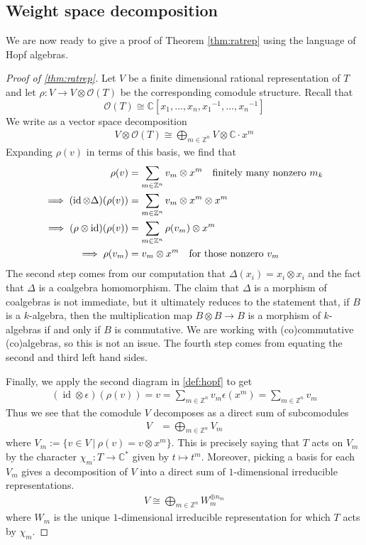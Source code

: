 \documentclass{amsart}
\newcommand{\st}{\ \vert \ }
\newcommand{\cO}{{\mathcal{O}}}
\DeclareMathOperator{\id}{id}
\newcommand{\C}{\mathbb{C}}
\newcommand{\Z}{\mathbb{Z}}
\newcommand{\inv}[1]{{#1}^{-1}}
\newcommand{\mc}[1]{\mathcal{#1}}
\newcommand{\set}[1]{\{#1\}}
\newcommand{\texty}[1]{\text{\quad #1}}
\numberwithin{equation}{section}
\theoremstyle{plain} %
\theoremstyle{definition}
\theoremstyle{remark}
\begin{document}
\subsection{Weight space decomposition}
We are now ready to give a proof of Theorem \ref{thm:ratrep} using the language of Hopf algebras.
\begin{proof}
	[Proof of \ref{thm:ratrep}] Let $V$ be a finite dimensional rational representation of $T$
	and let $\rho: V\to V\otimes \mc O(T)$ be the corresponding comodule structure. Recall that
	\[\cO(T)\cong \C[x_1,\dots,x_n,\inv{x_1},\dots,\inv{x_n}]\] We write as a vector space
	decomposition \begin{align*}
		V \otimes \mc O(T) \cong \bigoplus_{m\in\Z^n} V\otimes \C\cdot x^m
	\end{align*} Expanding $\rho(v)$ in terms of this basis, we find that \begin{align*}
		\rho(v)                                & = \sum_{m\in\Z^n} v_m\otimes x^m \texty{finitely many nonzero $m_k$} \\
		\implies (\id \otimes \Delta)(\rho(v)) & = \sum_{m\in\Z^n} v_m\otimes x^m\otimes x^m                          \\
		\implies (\rho\otimes \id)(\rho(v))    & = \sum_{m\in\Z^n} \rho(v_m)\otimes x^m                               \\
		\implies \rho(v_m)                     & = v_m\otimes x^m \texty{for those nonzero $v_m$}
	\end{align*} The second step comes from our computation that
	$\Delta(x_i) = x_i\otimes x_i$
	and the fact that $\Delta$ is a coalgebra homomorphism. The claim that $\Delta$ is a
	morphism of coalgebras is not immediate, but it ultimately reduces to the statement that, if $B$ is
	a $k$-algebra, then the multiplication map $B\otimes B\to B$ is a morphism of $k$-algebras if and only if $B$ is commutative.
	We are working with (co)commutative (co)algebras, so this is not an issue. The fourth step comes from equating the second and third left hand sides.

	\hfill

	Finally, we apply the second diagram in \ref{def:hopf} to get \begin{align*}
		(\id\otimes \epsilon)(\rho(v)) = v = \sum_{m\in\Z^n} v_m\epsilon(x^m) = \sum_{m\in\Z^n} v_m
	\end{align*} Thus we see that the comodule $V$ decomposes as a direct sum of subcomodules \begin{align*}
		V & = \bigoplus_{m\in\Z^n} V_m
	\end{align*} where $V_m := \set{v\in V \st \rho(v) = v\otimes x^m}$. This is precisely saying that $T$ acts on $V_m$ by the character $\chi_m: T\to \C^*$ given by $t\mapsto t^m$.
	Moreover, picking a basis for each $V_m$ gives a decomposition of $V$ into a direct sum of $1$-dimensional irreducible representations.
	\begin{align*}
		V \cong \bigoplus_{m\in\Z^n} W_m^{\oplus n_m}
	\end{align*} where $W_m$ is the unique $1$-dimensional irreducible representation for which $T$ acts by $\chi_m$.
\end{proof}
\end{document}
